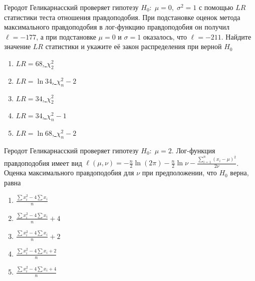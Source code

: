 \documentclass[t]{beamer}
\begin{document}
 \begin{frame} \label{19} 
\begin{block}{19} 

Геродот Геликарнасский проверяет гипотезу $H_0: \; \mu=0, \; \sigma^2=1$ с помощью $LR$ статистики теста отношения правдоподобия. При подстановке оценок метода максимального правдоподобия в лог-функцию правдоподобия он получил $\ell=-177$, а при подстановке $\mu=0$ и $\sigma=1$ оказалось, что $\ell=-211$. Найдите значение $LR$ статистики и укажите её закон распределения при верной $H_0$
 


 \end{block} 
\begin{enumerate} 
\item[] \hyperlink{19-Yes}{\beamergotobutton{} $LR=68$, $\chi^2_2$}
\item[] \hyperlink{19-No}{\beamergotobutton{} $LR=\ln 34$, $\chi^2_n-2$}
\item[] \hyperlink{19-No}{\beamergotobutton{} $LR=34$, $\chi^2_2$}
\item[] \hyperlink{19-No}{\beamergotobutton{} $LR=34$, $\chi^2_n-1$}
\item[] \hyperlink{19-No}{\beamergotobutton{} $LR=\ln 68$, $\chi^2_n-2$}
\end{enumerate} 
\end{frame} 


 \begin{frame} \label{20} 
\begin{block}{20} 

Геродот Геликарнасский проверяет гипотезу $H_0: \; \mu=2$. Лог-функция правдоподобия имеет вид $\ell(\mu,\nu)=-\frac{n}{2}\ln (2\pi)-\frac{n}{2}\ln \nu -\frac{\sum_{i=1}^n(x_i-\mu)^2}{2\nu}$. Оценка максимального правдоподобия для $\nu$ при предположении, что $H_0$ верна, равна
 


 \end{block} 
\begin{enumerate} 
\item[] \hyperlink{20-No}{\beamergotobutton{} $\frac{\sum x_i^2 - 4\sum x_i}{n}$}
\item[] \hyperlink{20-Yes}{\beamergotobutton{} $\frac{\sum x_i^2 - 4\sum x_i}{n}+4$}
\item[] \hyperlink{20-No}{\beamergotobutton{} $\frac{\sum x_i^2 - 4\sum x_i}{n}+2$}
\item[] \hyperlink{20-No}{\beamergotobutton{} $\frac{\sum x_i^2 - 4\sum x_i+2}{n}$}
\item[] \hyperlink{20-No}{\beamergotobutton{} $\frac{\sum x_i^2 - 4\sum x_i+4}{n}$}
\end{enumerate} 
\end{frame} 
\end{document}
